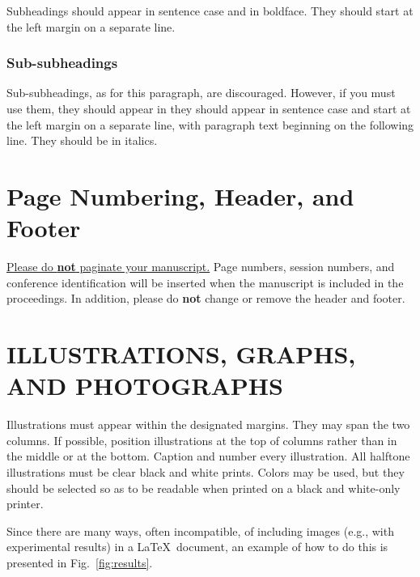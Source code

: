 \documentclass[a4paper,10pt,oneside]{article}
\begin{document}
\begin{sloppy}
Subheadings should appear in sentence case and in boldface. They should start at the left margin on a separate line. 
 
\subsubsection{Sub-subheadings}
\label{sssec:subsubhead}

Sub-subheadings, as for this paragraph, are discouraged. However, if you must use them, they should appear in they should appear in sentence case and start at the left margin on a separate line, with paragraph text beginning on the following line. They should be in italics.  \\

\section{Page Numbering, Header, and Footer}
\label{sec:page}

\underline{Please do {\bf not} paginate your manuscript.} Page numbers, session numbers, and conference identification will be inserted when the manuscript is included in the proceedings. In addition, please do {\bf not} change or remove the header and footer.

\section{ILLUSTRATIONS, GRAPHS, AND PHOTOGRAPHS}
\label{sec:illust}

Illustrations must appear within the designated margins. They may span the two columns. If possible, position illustrations at the top of columns rather than in the middle or at the bottom. Caption and number every illustration. All halftone illustrations must be clear black and white prints. Colors may be used, but they should be selected so as to be readable when printed on a black and white-only printer.

Since there are many ways, often incompatible, of including images (e.g., with experimental results) in a \LaTeX ~document, an example of how to do this is presented in Fig.~\ref{fig:results}.


\end{sloppy}
\end{document}
